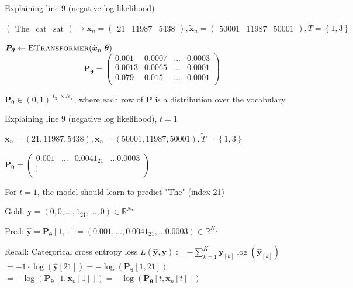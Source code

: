 \documentclass[12pt,aspectratio=169,handout]{beamer}
\begin{document}
\begin{frame}{Explaining line 9 (negative log likelihood)}
	
	$
	\begin{pmatrix}
		\text{The} &
		\text{cat} &
		\text{sat}
	\end{pmatrix}
	\rightarrow
	\bm{x}_n =
	\begin{pmatrix}
		21 &
		11987 &
		5438 
	\end{pmatrix},
	\bm{\tilde{x}}_n =
	\begin{pmatrix}
		50001 &
		11987 &
		50001
	\end{pmatrix},
	\tilde{T} = \left\{ 1, 3 \right\}
	$
	
	$\bm{P_{\theta}} \gets \textsc{ETransformer}(\tilde{\bm{x}}_n | \bm{\theta})$
	$$
	\bm{P_{\theta}} =
	\begin{pmatrix}
		0.001 & 0.0007 & \ldots & 0.0003 \\
		0.0013 & 0.0065 & \ldots & 0.0001 \\
		0.079 & 0.015 & \ldots & 0.0001 \\
	\end{pmatrix}
	$$
	
	$\bm{P_{\theta}} \in (0,1)^{\ell_{\text{x}} \times N_{\text{V}}}$, where each row of $\bm{P}$ is a distribution over the vocabulary
	
\end{frame}


\begin{frame}{Explaining line 9 (negative log likelihood), $t = 1$}
	
	\begin{small}
		$\bm{x}_n = (21, 11987, 5438), \bm{\tilde{x}}_n = (50001, 11987, 50001), \tilde{T} = \left\{ 1, 3 \right\}$
		
		$
		\bm{P_{\theta}} =
		\begin{pmatrix}
			0.001 & \ldots & 0.0041_{21} & \ldots 0.0003 \\
			\vdots &  &  &  \\
		\end{pmatrix}
		$
	\end{small}	
	
	For $t = 1$, the model should learn to predict "The" (index 21)
	
	Gold: $\bm{y} = (0, 0, \ldots, 1_{21}, \ldots, 0) \in \mathbb{R}^{N_{\text{V}}}$
	
	Pred: $\bm{\hat{y}} = \bm{P_{\theta}}[1,:] = (0.001, \ldots, 0.0041_{21}, \ldots 0.0003) \in \mathbb{R}^{N_{\text{V}}}$
	
	\begin{block}{Recall: Categorical cross entropy loss}
		$L (\bm{\hat{y}, \bm{y}}) := - \sum_{k = 1}^{K} \bm{y}_{[k]} \log \left(  \bm{\hat{y}}_{[k]} \right)$ \\
		$= - 1 \cdot \log (\bm{\hat{y}}[21])
		= - \log(\bm{P_{\theta}}[1, 21])$ \\
		$= - \log(\bm{P_{\theta}}[1, \bm{x}_n[1]]) 
		= - \log(\bm{P_{\theta}}[t, \bm{x}_n[t]])$	
	\end{block}
	
\end{frame}
\end{document}
